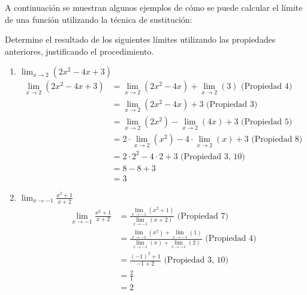 A continuación se muestran algunos ejemplos de cómo se puede calcular el límite de una función 
utilizando la técnica de sustitución:

\ex{} {
    Determine el resultado de los siguientes límites utilizando las propiedades 
    anteriores, justificando el procedimiento. \\

    \begin{enumerate}
        \item $\lim_{x \to 2} (2x^2 - 4x + 3)$ \\
            \begin{align*}
                \lim_{x \to 2} (2x^2 - 4x + 3) &= \lim_{x \to 2} (2x^2 - 4x) + \lim_{x \to 2} (3) \text{     (Propiedad 4)} \\
                &= \lim_{x \to 2} (2x^2 - 4x) + 3 \text{     (Propiedad 3)} \\
                &= \lim_{x \to 2} (2x^2) - \lim_{x \to 2} (4x) + 3 \text{     (Propiedad 5)} \\
                &= 2 \cdot \lim_{x \to 2} (x^2) - 4 \cdot \lim_{x \to 2} (x) + 3 \text{     (Propiedad 8)} \\
                &= 2 \cdot 2^2 - 4 \cdot 2 + 3 \text{     (Propiedad 3, 10)} \\
                &= 8 - 8 + 3 \\
                &= 3
            \end{align*}

        \item $\lim_{x \to -1} \frac{x^2+1}{x+2}$ \\
            \begin{align*}
                \lim_{x \to -1} \frac{x^2+1}{x+2} &= \frac{\lim_{x \to -1} (x^2+1)}{\lim_{x \to -1} (x+2)} \text{     (Propiedad 7)} \\
                &= \frac{\lim_{x \to -1} (x^2) + \lim_{x \to -1} (1)}{\lim_{x \to -1} (x) + \lim_{x \to -1} (2)} \text{     (Propiedad 4)} \\
                &= \frac{(-1)^2 + 1}{-1 + 2} \text{     (Propiedad 3, 10)} \\
                &= \frac{2}{1} \\
                &= 2
            \end{align*}
    \end{enumerate}
}
